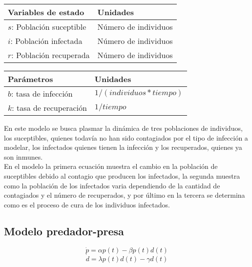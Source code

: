 \documentclass{article}
\begin{document}
        \begin{tabular}[t]{|p{4cm} p{3.5cm}|}
            \hline
            \textbf{Variables de estado} & \textbf{Unidades} \\
            \hline
            $s$: Población suceptible & Número de individuos\\
            $i$: Población infectada  & Número de individuos\\
            $r$: Población recuperada & Número de individuos\\
            \hline
        \end{tabular}
        \hspace{0.5cm}
        \begin{tabular}[t]{|p{4cm} p{4cm}|}
            \hline
            \textbf{Parámetros} & \textbf{Unidades} \\
            \hline
            $b$: tasa de infección    & $1/(individuos * tiempo)$\\
            $k$: tasa de recuperación & $1/tiempo$\\
            \hline
        \end{tabular}
        \cite{sir}

        \vspace{0.5cm}

        En este modelo se busca plasmar la dinámica de tres poblaciones de
        individuos, los suceptibles, quienes todavía no han sido contagiados
        por el tipo de infección a modelar, los infectados quienes tienen la
        infección y los recuperados, quienes ya son inmunes.\\

        En el modelo la primera ecuación muestra el cambio en la población de
        suceptibles debido al contagio que producen los infectados, la
        segunda muestra como la población de los infectados varia
        dependiendo de la cantidad de contagiados y el número de recuperados, y
        por último en la tercera se determina como es el proceso de cura
        de los individuos infectados.

    \subsection{Modelo predador-presa}

        \Large
        $$\dot{p} = \alpha p(t) - \beta p(t) d(t)$$
        $$\dot{d} = \lambda p(t) d(t) - \gamma d(t)$$
        \normalsize

        \vspace{0.5cm}
\end{document}
